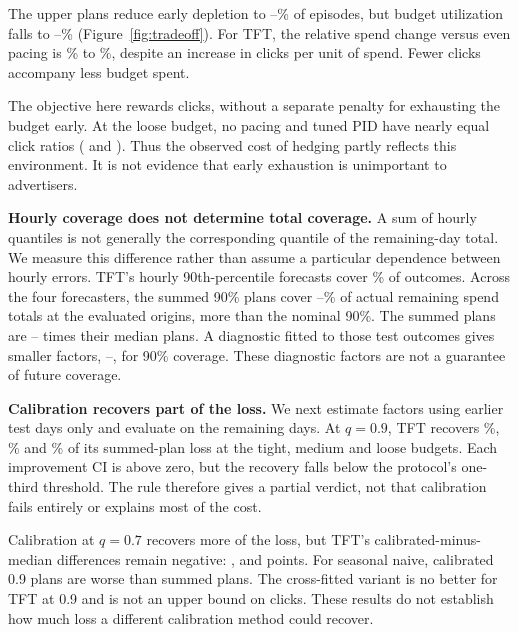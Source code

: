 \documentclass[sigconf,nonacm]{acmart}
\begin{document}
The upper plans reduce early depletion to
--\% of episodes, but budget
utilization falls to --\%
(Figure~\ref{fig:tradeoff}). For TFT, the relative spend change versus even
pacing is \% to \%, despite
an increase in clicks per unit of spend. Fewer clicks accompany less budget
spent.

The objective here rewards clicks, without a separate penalty for exhausting
the budget early. At the loose budget, no pacing and tuned PID have nearly
equal click ratios ( and
). Thus the observed cost of hedging partly reflects
this environment. It is not evidence that early exhaustion is unimportant to
advertisers.

\textbf{Hourly coverage does not determine total coverage.} A sum of hourly
quantiles is not generally the corresponding quantile of the remaining-day
total. We measure this difference rather than assume a particular dependence
between hourly errors. TFT's hourly 90th-percentile forecasts cover
\% of outcomes. Across the four forecasters, the summed
90\% plans cover --\% of actual
remaining spend totals at the evaluated origins, more than the nominal 90\%.
The summed plans are -- times their
median plans. A diagnostic fitted to those test outcomes gives smaller
factors, --, for 90\% coverage.
These diagnostic factors are not a guarantee of future coverage.

\textbf{Calibration recovers part of the loss.} We next estimate factors
using earlier test days only and evaluate on the remaining
 days. At $q=0.9$, TFT recovers
\%, \% and
\% of its summed-plan loss at the tight, medium and loose
budgets. Each improvement CI is above zero, but the recovery falls below
the protocol's one-third threshold. The rule therefore gives a partial
verdict, not that calibration fails entirely or explains most of the cost.

Calibration at $q=0.7$ recovers more of the loss, but TFT's calibrated-minus-median
differences remain negative: ,
 and  points. For seasonal
naive, calibrated 0.9 plans are worse than summed plans. The cross-fitted
variant is no better for TFT at 0.9 and is not an upper bound on clicks.
These results do not establish how much loss a different calibration method
could recover.
\end{document}

